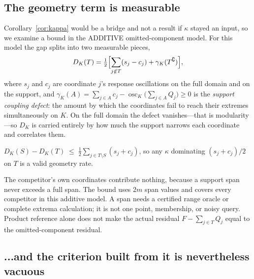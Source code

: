 \subsection{The geometry term is measurable}

Corollary~\ref{cor:kappa} would be a bridge and not a result if $\kappa$ stayed an input,
so we examine a bound in the ADDITIVE omitted-component model. For this model the gap
splits into two measurable pieces,
\begin{equation}
D_{K}(T)=\tfrac12\Bigl[\sum_{j\notin T}(s_{j}-c_{j})+\gamma_{K}(T^{\complement})\Bigr],
\label{eq:gapsplit}
\end{equation}
where $s_{j}$ and $c_{j}$ are coordinate $j$'s response oscillations on the full domain and
on the support, and
$\gamma_{K}(A)=\sum_{j\in A}c_{j}-\operatorname{osc}_{K}\bigl(\sum_{j\in A}Q_{j}\bigr)\ge0$
is the \emph{support coupling defect}: the amount by which the coordinates fail to reach
their extremes simultaneously on $K$. On the full domain the defect vanishes---that is
modularity---so $D_{K}$ is carried entirely by how much the support narrows each coordinate
and correlates them.


\begin{theorem}
\label{thm:kappabound}
$\displaystyle D_{K}(S)-D_{K}(T)\;\le\;\tfrac12\sum_{j\in T\setminus S}(s_{j}+c_{j})$,
so any $\kappa$ dominating $(s_{j}+c_{j})/2$ on $T$ is a valid geometry rate.
\end{theorem}


The competitor's own coordinates contribute nothing, because a support span never exceeds a
full span. The bound uses $2m$ span values and covers every competitor in this additive model.
A span needs a certified range oracle or complete extrema calculation; it is not one
point, membership, or noisy query. Product reference alone does not make the actual
residual $F-\sum_{j\in T}Q_j$ equal to the omitted-component residual.

\subsection{...and the criterion built from it is nevertheless vacuous}

